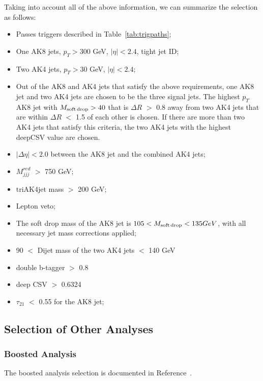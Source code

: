 Taking into account all of the above information, we can summarize the selection as follows:

\begin{itemize}
\item Passes triggers described in Table~\ref{tab:trigpaths};
\item One AK8 jets, $p_{T} > 300$ GeV, $|\eta| < 2.4$, tight jet ID;
\item Two AK4 jets, $p_{T} > 30$ GeV, $|\eta| < 2.4$;
\item Out of the AK8 and AK4 jets that satisfy the above requirements, one AK8 jet and two AK4 jets are chosen to be the three signal jets. The highest $p_{T}$ AK8 jet with $M_{\rm soft\,drop} > 40$ \GeV that is $\Delta R$ $>$ 0.8 away from two AK4 jets that are within $\Delta R$ $<$ 1.5 of each other is chosen. If there are more than two AK4 jets that satisfy this criteria, the two AK4 jets with the highest deepCSV value are chosen.
\item $|\Delta\eta| < 2.0$ between the AK8 jet and the combined AK4 jets;
\item $M_{jjj}^{red}$ $>$ 750 GeV;
\item triAK4jet mass $>$ 200 GeV;
\item Lepton veto;
\item The soft drop mass of the AK8 jet is $105 < M_{\rm soft\,drop} < 135GeV$, with all necessary jet mass corrections applied;
\item 90 $<$ Dijet mass of the two AK4 jets $<$ 140 GeV
\item double b-tagger $>$ 0.8
\item deep CSV $>$ 0.6324
\item $\tau_{21}$ $<$ 0.55 for the AK8 jet;
\end{itemize}

\subsection{Selection of Other Analyses}

\subsubsection{Boosted Analysis\label{sss:boost}}

The boosted analysis selection is documented in Reference~\cite{Sirunyan:2017isc}.

